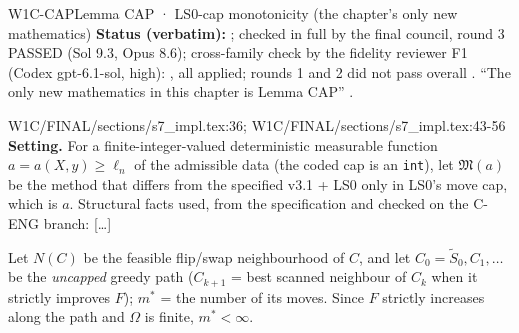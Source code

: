 \begin{card}{W1C-CAP}{Lemma CAP · LS0-cap monotonicity (the chapter's only new mathematics)}
\textbf{Status (verbatim):} ; checked in full by the final council, round 3 PASSED (Sol 9.3, Opus 8.6); cross-family check by the fidelity reviewer F1 (Codex gpt-6.1-sol, high): , all applied; rounds 1 and 2 did not pass overall . ``The only new mathematics in this chapter is Lemma CAP'' .
\begin{stmt}{W1C/FINAL/sections/s7_impl.tex:36; W1C/FINAL/sections/s7_impl.tex:43-56}
\textbf{Setting.} For a finite-integer-valued deterministic measurable function $a=a(X,y)\ge\ell_n$ of the admissible data (the coded cap is an \texttt{int}), let $\mathfrak M(a)$ be the method that differs from the specified v3.1 + LS0 only in LS0's move cap, which is $a$. Structural facts used, from the specification and checked on the C-ENG branch: [\ldots]

Let $N(C)$ be the feasible flip/swap neighbourhood of $C$, and let $C_0=\tilde{S}_0,C_1,\dots$ be the \emph{uncapped} greedy path ($C_{k+1}$ = best scanned neighbour of $C_k$ when it strictly improves $F$); $m^*$ = the number of its moves. Since $F$ strictly increases along the path and $\Omega$ is finite, $m^*<\infty$.


\end{stmt}
\end{card}
